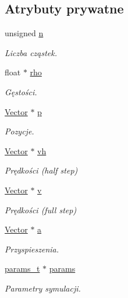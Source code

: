 \subsection*{Atrybuty prywatne}
\begin{DoxyCompactItemize}
\item 
unsigned \hyperlink{classsimulation_a22eb97765a5c60adf3d995f7a110da70}{n}
\begin{DoxyCompactList}\small\item\em Liczba cząstek. \end{DoxyCompactList}\item 
float $\ast$ \hyperlink{classsimulation_a44081d4edd92e17a3e1067b976031a00}{rho}
\begin{DoxyCompactList}\small\item\em Gęstości. \end{DoxyCompactList}\item 
\hyperlink{class_vector}{Vector} $\ast$ \hyperlink{classsimulation_a5412fd01febe99f12ae38e30eb692ff0}{p}
\begin{DoxyCompactList}\small\item\em Pozycje. \end{DoxyCompactList}\item 
\hyperlink{class_vector}{Vector} $\ast$ \hyperlink{classsimulation_ae6da1f15728f49be7b0793700866ede9}{vh}
\begin{DoxyCompactList}\small\item\em Prędkości (half step) \end{DoxyCompactList}\item 
\hyperlink{class_vector}{Vector} $\ast$ \hyperlink{classsimulation_a39dbad79b1b8667840638a35e839a3f7}{v}
\begin{DoxyCompactList}\small\item\em Prędkości (full step) \end{DoxyCompactList}\item 
\hyperlink{class_vector}{Vector} $\ast$ \hyperlink{classsimulation_a7b5ca0e5fc096989be7966a73c360b7f}{a}
\begin{DoxyCompactList}\small\item\em Przyspieszenia. \end{DoxyCompactList}\item 
\hyperlink{structparams__t}{params\+\_\+t} $\ast$ \hyperlink{classsimulation_a861b82cc3c0e7e58abfba464a133dae3}{params}
\begin{DoxyCompactList}\small\item\em Parametry symulacji. \end{DoxyCompactList}\end{DoxyCompactItemize}
